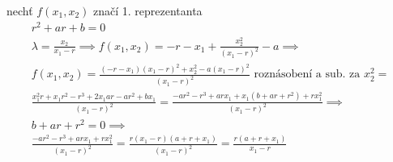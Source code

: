 \documentclass[12pt, a4paper]{article}
\begin{document}
nechť $f(x_1,x_2)$ značí 1. reprezentanta
\begin{gather*}
r^2 + ar+b = 0\\
\lambda = \frac{x_2}{x_1-r} \implies f(x_1,x_2) = - r - x_1 + \frac{x_2^2}{(x_1-r)^2} - a \implies\\
f(x_1,x_2) = \frac{(-r-x_1)(x_1-r)^2+x_2^2-a(x_1-r)^2}{(x_1-r)^2} \text{ roznásobení a sub. za $x_2^2$} =\\
\frac{x_1^2r+x_1r^2-r^3+2x_1ar-ar^2+bx_1}{(x_1-r)^2} = \frac{-ar^2-r^3+arx_1+x_1(b+ar+r^2)+rx_1^2}{(x_1-r)^2} \implies\\
b+ar+r^2 = 0 \implies\\
\frac{-ar^2-r^3+arx_1+rx_1^2}{(x_1-r)^2} = \frac{r(x_1-r)(a+r+x_1)}{(x_1-r)^2} = \frac{r(a+r+x_1)}{x_1-r}
\end{gather*}
\end{document}
